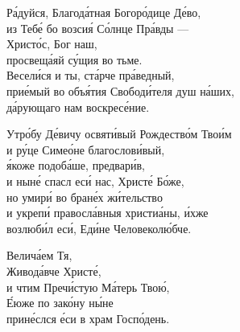 \documentclass{article}
\begin{document}
%
Ра́дуйся, Благода́тная Богоро́дице Де́во, \\
из Тебе́ бо возсия́ Со́лнце Пра́вды --- \\
      \cont Христо́с, Бог наш, \\
просвеща́яй су́щия во тьме. \\
Весели́ся и ты, ста́рче пра́ведный,\\
прие́мый во объя́тия Свободи́теля душ на́ших,\\
да́рующаго нам воскресе́ние.

Утро́бу Де́вичу освяти́вый Рождество́м Твои́м \\
и ру́це Симео́не благослови́вый, \\
я́коже подоба́ше, предвари́в, \\
и ныне́ спасл еси́ нас, Христе́ Бо́же,\\
но умири́ во бране́х жи́тельство \\
и укрепи́ правосла́вныя христиа́ны, и́хже \\
    \cont возлюби́л еси́, Еди́не Человеколю́бче.

Велича́ем Тя, \\
Живода́вче Христе́, \\
и чтим Пречи́стую Ма́терь Твою́, \\
Е́юже по зако́ну ны́не \\
прине́слся е́си в храм Госпо́день.
\end{document}
